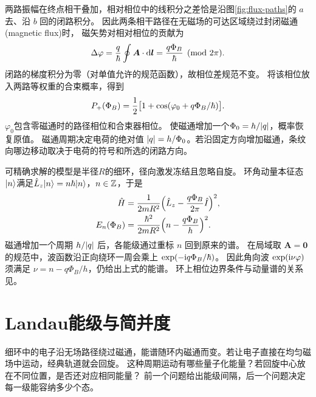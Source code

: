 两路振幅在终点相干叠加，相对相位中的线积分之差恰是沿图\ref{fig:flux-paths}的 $a$ 去、沿 $b$ 回的闭路积分。
因此两条相干路径在无磁场的可达区域绕过封闭磁通(magnetic flux)时，
磁矢势对相对相位的贡献为
\begin{equation}
    \Delta\varphi = \frac q\hbar\oint\bm A \cdot \mathop{}\!\mathrm{d}\bm l = \frac{q\Phi_B}{\hbar}
    \pmod{2\pi}.
\end{equation}
闭路的梯度积分为零（对单值允许的规范函数），故相位差规范不变。
将该相位放入两路等权重的合束概率，得到
\begin{equation}
    P_+(\Phi_B) = \frac12
        \bigl[1 + \cos(\varphi_0 + q\Phi_B/\hbar)\bigr].
\end{equation}
$\varphi_0$包含零磁通时的路径相位和合束器相位。
使磁通增加一个$\Phi_0 = h/\lvert q\rvert$，概率恢复原值。
磁通周期决定电荷的绝对值 $\lvert q\rvert = h/\Phi_0$。若沿固定方向增加磁通，条纹向哪边移动取决于电荷的符号和所选的闭路方向。

可精确求解的模型是半径$R$的细环，径向激发冻结且忽略自旋。
环角动量本征态$\lvert n\rangle$满足$\hat{L}_z\lvert n\rangle = n\hbar\lvert n\rangle$，$n \in \mathbb{Z}$，于是
\begin{subequations}
    \begin{align}
        \hat{H} &= \frac1{2mR^2}\Bigl(\hat{L}_z - \frac{q\Phi_B}{2\pi}\hat{I}\Bigr)^2,\\
        E_n(\Phi_B) &= \frac{\hbar^2}{2mR^2}\Bigl(n - \frac{q\Phi_B}{h}\Bigr)^2.
    \end{align}
\end{subequations}
磁通增加一个周期 $h/\lvert q\rvert$ 后，各能级通过重标 $n$ 回到原来的谱。
在局域取 $\bm A = \bm0$ 的规范中，波函数沿正向绕环一周会乘上 $\exp(-\mathrm{i} q\Phi_B/\hbar)$。
因此角向波 $\exp(\mathrm{i}\nu\varphi)$ 须满足 $\nu = n - q\Phi_B/h$，仍给出上式的能谱。
环上相位边界条件与动量谱的关系见。

\section{Landau能级与简并度}
\label{sec:landau}
细环中的电子沿无场路径绕过磁通，能谱随环内磁通而变。若让电子直接在均匀磁场中运动，经典轨道就会回旋。
这种周期运动有哪些量子化能量？若回旋中心放在不同位置，是否还对应相同能量？
前一个问题给出能级间隔，后一个问题决定每一级能容纳多少个态。

